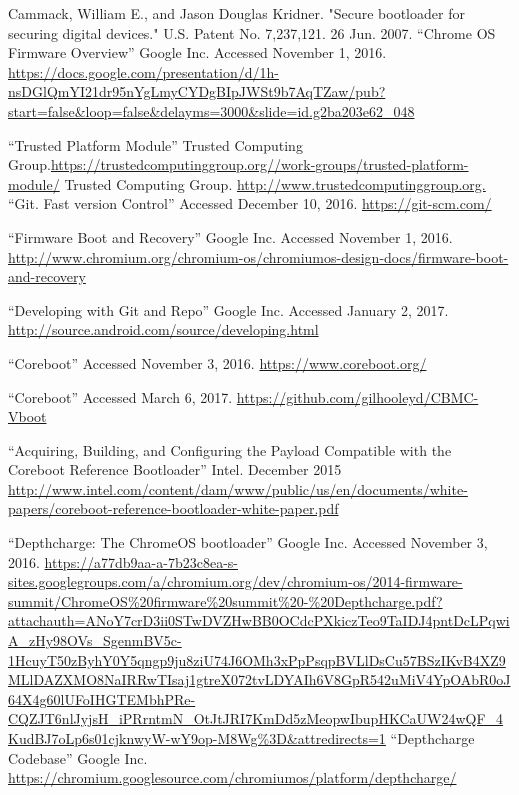 \documentclass[../report.tex]{subfiles}
\begin{document}
\begin{singlespace}
\begin{flushleft}
\begin{footnotesize}
\begin{thebibliography}{\kern\bibindent}
        Cammack, William E., and Jason Douglas Kridner. "Secure bootloader for securing digital devices." U.S. Patent No. 7,237,121. 26 Jun. 2007.
        ``Chrome OS Firmware Overview'' Google Inc. Accessed November 1, 2016. \url{https://docs.google.com/presentation/d/1h-nsDGlQmYI21dr95nYgLmyCYDgBIpJWSt9b7AqTZaw/pub?start=false&loop=false&delayms=3000&slide=id.g2ba203e62_048}        

        ``Trusted Platform Module'' Trusted Computing Group.\url{https://trustedcomputinggroup.org//work-groups/trusted-platform-module/}
        Trusted Computing Group. \url{http://www.trustedcomputinggroup.org.}
        ``Git. Fast version Control'' Accessed December 10, 2016. \url{https://git-scm.com/}

    ``Firmware Boot and Recovery'' Google Inc. Accessed November 1, 2016. \url{http://www.chromium.org/chromium-os/chromiumos-design-docs/firmware-boot-and-recovery}

    ``Developing with Git and Repo'' Google Inc. Accessed January 2, 2017. \url{http://source.android.com/source/developing.html}

    ``Coreboot'' Accessed November 3, 2016. \url{https://www.coreboot.org/}

    ``Coreboot'' Accessed March 6, 2017. \url{https://github.com/gilhooleyd/CBMC-Vboot}

    ``Acquiring, Building, and Configuring the Payload Compatible with the Coreboot Reference Bootloader'' Intel. December 2015 \url{http://www.intel.com/content/dam/www/public/us/en/documents/white-papers/coreboot-reference-bootloader-white-paper.pdf}

    ``Depthcharge: The ChromeOS bootloader'' Google Inc. Accessed November 3, 2016.
    \url{https://a77db9aa-a-7b23c8ea-s-sites.googlegroups.com/a/chromium.org/dev/chromium-os/2014-firmware-summit/ChromeOS\%20firmware\%20summit\%20-\%20Depthcharge.pdf?attachauth=ANoY7crD3ii0STwDVZHwBB0OCdcPXkiczTeo9TaIDJ4pntDcLPqwiA_zHy98OVs_SgenmBV5c-1HcuyT50zByhY0Y5qngp9ju8ziU74J6OMh3xPpPsqpBVLlDsCu57BSzIKvB4XZ9MLlDAZXMO8NaIRRwTIsaj1gtreX072tvLDYAIh6V8GpR542uMiV4YpOAbR0oJ64X4g60lUFoIHGTEMbhPRe-CQZJT6nlJyjsH_iPRrntmN_OtJtJRI7KmDd5zMeopwIbupHKCaUW24wQF_4KudBJ7oLp6s01cjknwyW-wY9op-M8Wg\%3D&attredirects=1}
    ``Depthcharge Codebase'' Google Inc. \url{https://chromium.googlesource.com/chromiumos/platform/depthcharge/}


\end{thebibliography}
\end{footnotesize}
\end{flushleft}
\end{singlespace}
\end{document}

